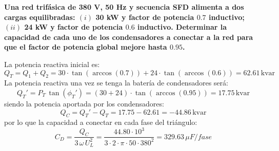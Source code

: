 		\begin{example}\label{ex.compensacion_Q_trif}
		    \textbf{Una red trifásica de 380 V, 50 Hz y secuencia SFD alimenta a dos cargas equilibradas: $(i)$ 30 kW y factor de potencia $0.7$ inductivo; $(ii)$ 24 kW y factor de potencia $0.6$ inductivo. Determinar la capacidad de cada uno de los condensadores a conectar a la red para que el factor de potencia global mejore hasta $0.95$.}
		    
		    La potencia reactiva inicial es:
		    \begin{equation*}
		        Q_T=Q_1+Q_2=30\cdot \tan(\arccos(0.7))+24\cdot \tan(\arccos(0.6))=62.61\,\text{kvar}
		    \end{equation*}
		    La potencia reactiva una vez se tenga la batería de condensadores será: 
		    \begin{equation*}
		        Q_T'=P_T\,\tan(\phi_T')=(30+24)\cdot \tan(\arccos(0.95))=17.75\,\text{kvar}
		    \end{equation*}
		    siendo la potencia aportada por los condensadores:
		    \begin{equation*}
		        Q_C=Q_T'-Q_T=17.75-62.61=-44.86\,\text{kvar}
		    \end{equation*}
		    por lo que la capacidad a conectar en cada fase del triángulo: 
		    \begin{equation*}
		     C_D=\dfrac{Q_C}{3\,\omega\,U_L^2}=\dfrac{44.80\cdot 10^3}{3\cdot 2\cdot \pi\cdot 50\cdot 380^2}=329.63\,\mu F/fase
		    \end{equation*}
		\end{example}

		 
	
	
	
	

